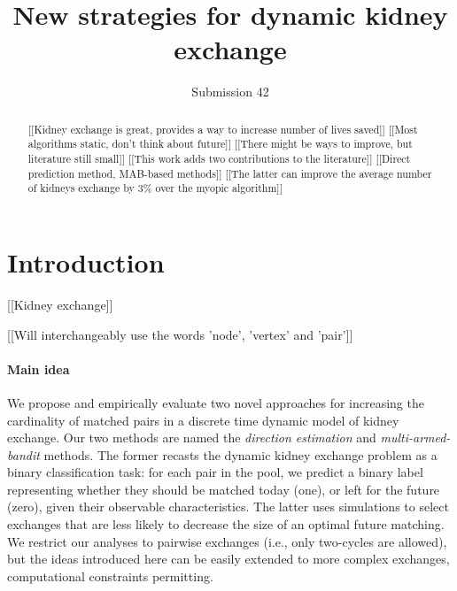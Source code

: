 \documentclass[format=acmsmall, review=false]{acmart}
\begin{document}
\title[New strategies for dynamic kidney exchange]{New strategies for dynamic kidney exchange}  
\author{Submission 42}

\begin{abstract}
[[Kidney exchange is great, provides a way to increase number of lives saved]] [[Most algorithms static, don't think about future]] [[There might be ways to improve, but literature still small]] [[This work adds two contributions to the literature]] [[Direct prediction method, MAB-based methods]] [[The latter can improve the average number of kidneys exchange by 3\% over the myopic algorithm]]
\end{abstract}


\maketitle

\section{Introduction}

[[Kidney exchange]]

[[Will interchangeably use the words 'node', 'vertex' and 'pair']]

\paragraph{\textbf{Main idea}} We propose and empirically evaluate two novel approaches for increasing the cardinality of matched pairs in a discrete time dynamic model of kidney exchange. Our two methods are named the \emph{direction estimation} and \emph{multi-armed-bandit} methods. The former recasts the dynamic kidney exchange problem as a binary classification task: for each pair in the pool, we predict a binary label representing whether they should be matched today (one), or left for the future (zero), given their observable characteristics. The latter uses simulations to select exchanges that are less likely to decrease the size of an optimal future matching. We restrict our analyses to pairwise exchanges (i.e., only two-cycles are allowed), but the ideas introduced here can be easily extended to more complex exchanges, computational constraints permitting.
\end{document}
